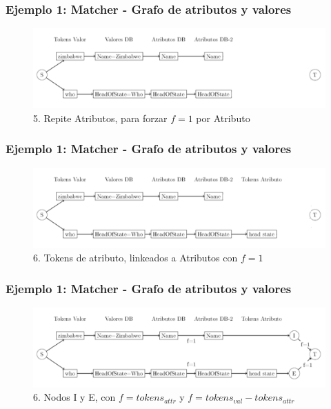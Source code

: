 \begin{frame}
\frametitle{Ejemplo 1: Matcher - Grafo de atributos y valores}
\begin{figure}
  \centering
    \includegraphics[scale=.33]{graficos/presentacion/ejemplo-grafo-matcher-1-5-2}
    \caption{5. Repite Atributos, para forzar $f=1$ por Atributo}
\end{figure}
\end{frame}

\begin{frame}
\frametitle{Ejemplo 1: Matcher - Grafo de atributos y valores}
\begin{figure}
  \centering
    \includegraphics[scale=.33]{graficos/presentacion/ejemplo-grafo-matcher-1-5-3}
    \caption{6. Tokens de atributo, linkeados a Atributos con $f=1$}
\end{figure}
\end{frame}

\begin{frame}
\frametitle{Ejemplo 1: Matcher - Grafo de atributos y valores}
\begin{figure}
  \centering
    \includegraphics[scale=.33]{graficos/presentacion/ejemplo-grafo-matcher-1-6}
    \caption{6. Nodos I y E, con $f=tokens_{attr}$ y $f=tokens_{val} - tokens_{attr}$}
\end{figure}
\end{frame}


